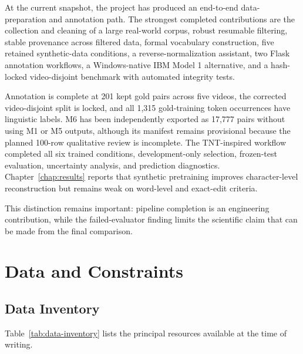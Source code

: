 \documentclass[12pt, a4paper, twoside, openany]{report}
\begin{document}
At the current snapshot, the project has produced an end-to-end data-preparation and annotation path. The strongest completed contributions are the collection and cleaning of a large real-world corpus, robust resumable filtering, stable provenance across filtered data, formal vocabulary construction, five retained synthetic-data conditions, a reverse-normalization assistant, two Flask annotation workflows, a Windows-native IBM Model 1 alternative, and a hash-locked video-disjoint benchmark with automated integrity tests.

Annotation is complete at 201 kept gold pairs across five videos, the corrected video-disjoint split is locked, and all 1,315 gold-training token occurrences have linguistic labels. M6 has been independently exported as 17,777 pairs without using M1 or M5 outputs, although its manifest remains provisional because the planned 100-row qualitative review is incomplete. The TNT-inspired workflow completed all six trained conditions, development-only selection, frozen-test evaluation, uncertainty analysis, and prediction diagnostics. Chapter~\ref{chap:results} reports that synthetic pretraining improves character-level reconstruction but remains weak on word-level and exact-edit criteria.

This distinction remains important: pipeline completion is an engineering contribution, while the failed-evaluator finding limits the scientific claim that can be made from the final comparison.



\section{Data and Constraints}

\subsection{Data Inventory}

Table~\ref{tab:data-inventory} lists the principal resources available at the time of writing.

\end{document}
